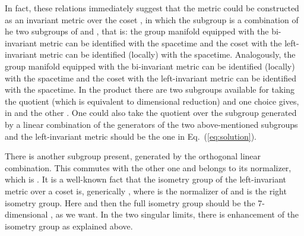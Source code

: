 \documentclass[12pt,a4paper]{article}
\begin{document}
In fact, these relations immediately suggest that the metric could be
constructed as an invariant metric over the coset \coordHE{}, in which the subgroup \coordHE{} is a combination of he
two \coordHE{} subgroups of \coordHE{} and \coordHE{}, that is: the group manifold
\coordHE{} equipped with the bi-invariant metric can be identified with the
\coordHE{} spacetime and the coset \coordHE{} with the left-invariant
metric can be identified (locally) with the \coordHE{} spacetime. Analogously,
the group manifold \coordHE{} equipped with the bi-invariant metric can be
identified (locally) with the \coordHE{} spacetime and the coset \coordHE{}
with the left-invariant metric can be identified with the \coordHE{} spacetime.
In the product \coordHE{} there are two \coordHE{} subgroups available
for taking the quotient (which is equivalent to dimensional reduction) and one
choice gives, in \coordHE{}  \coordHE{} and the other \coordHE{}. One could also take the quotient over the \coordHE{} subgroup
generated by a linear combination of the generators of the two above-mentioned
\coordHE{} subgroups and the left-invariant metric should be the one in
Eq.~(\ref{eq:solution}).

There is another \coordHE{} subgroup present, generated by the orthogonal
linear combination. This \coordHE{} commutes with the other one and
belongs to its normalizer, which is \coordHE{}. It is a
well-known fact \cite{Coquereaux:ne} that the isometry group of the
left-invariant metric over a coset \coordHE{} is, generically \coordHE{}, where \coordHE{} is the normalizer of \coordHE{} and \coordHE{} is the
right isometry group. Here \coordHE{} and then the full isometry
group should be the 7-dimensional \coordHE{},
as we want. In the two singular limits, there is enhancement of the
isometry group as explained above.
\end{document}
